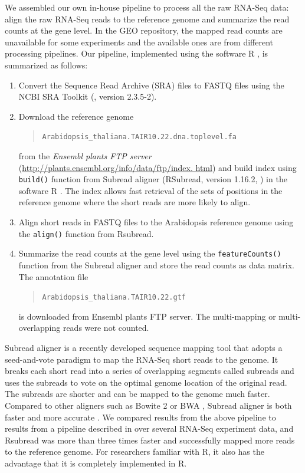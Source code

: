 \documentclass[letterpaper,12pt]{article}
\begin{document}
We assembled our own in-house pipeline to process all the raw RNA-Seq data:
align the raw RNA-Seq reads to the reference genome and summarize the read counts at the 
gene level. In the GEO repository, the
mapped read counts are unavailable for some experiments and the available ones
are from different processing pipelines.  
Our pipeline, implemented using the software R \citep{Rpackage}, is summarized as follows: 
\begin{enumerate}
	\item Convert the Sequence Read Archive (SRA) files to FASTQ files using the NCBI SRA Toolkit 
	(\cite{leinonen2010sequence}, version 2.3.5-2).
	\item Download the reference genome 
	\begin{quote}
		\verb|Arabidopsis_thaliana.TAIR10.22.dna.toplevel.fa |
	\end{quote} 
	from the \textit{ Ensembl plants FTP server} 
	(\url{http://plants.ensembl.org/info/data/ftp/index. html}) and build index using 
	\verb|build()| function from 
	Subread aligner (RSubread, version 1.16.2, \citealt{liao2013subread}) in the software R
	\citep{ Rpackage}. The index allows fast retrieval of the sets of positions in the reference 
	genome where the short reads are more likely to align. 
	\item Align short reads in FASTQ files to the Arabidopsis reference genome using the 
	\verb|align()| function from Rsubread. 
	\item
	Summarize the read counts at the gene level using the \verb|featureCounts()| function from the
	Subread aligner
	and store the read counts as data matrix.  
	The annotation file 
	\begin{quote}
		\verb"Arabidopsis_thaliana.TAIR10.22.gtf" 
	\end{quote}
	is downloaded from Ensembl plants FTP server. The multi-mapping or
	multi-overlapping reads were not counted.  
	
\end{enumerate}
Subread aligner is a recently developed sequence mapping tool that adopts a
seed-and-vote paradigm to map the RNA-Seq short reads to the genome. 
It breaks each short read into a series of overlapping segments called
subreads and uses the subreads to vote on the optimal genome location of the
original read. The subreads are shorter and can be mapped to the genome much
faster.
Compared to other aligners such as Bowite 2 \citep{langmead2012fast} or BWA
\citep{li2009fast}, Subread aligner is both faster and more accurate
\citep{liao2013subread}. We compared results from the above
pipeline to results from a pipeline described in \citet{anders2013count} over several RNA-Seq 
experiment data, and Rsubread
was more than three times faster and successfully mapped more reads to the
reference genome.  For researchers familiar with R, it also has the advantage
that it is completely implemented in R.
\end{document}
